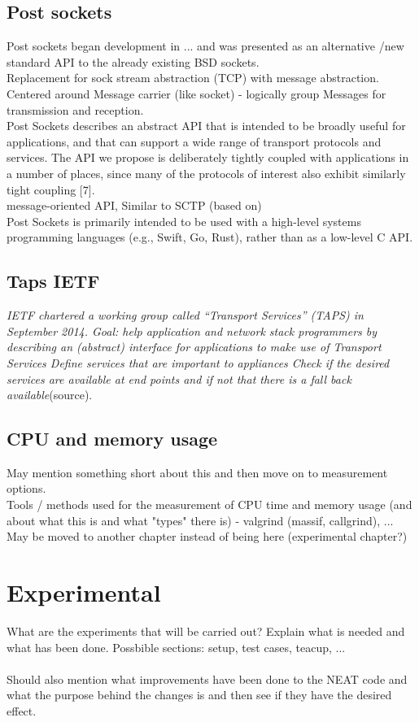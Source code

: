 \documentclass[12pt]{report}
\begin{document}
\section{Post sockets}
Post sockets began development in ... and was presented as an alternative /new standard  API to the already existing BSD sockets. \\
Replacement for sock stream abstraction (TCP) with message abstraction. \\
Centered around Message carrier (like socket) - logically group Messages for transmission and reception.\\
Post Sockets describes an abstract API that is intended to be broadly useful for applications, and that can support a wide range of transport protocols and services. The API we propose
is deliberately tightly coupled with applications in a number of places, since many of the protocols of interest also exhibit similarly tight coupling [7].\\
message-oriented API,
Similar to SCTP (based on) \\
Post Sockets is primarily intended to be used with a high-level systems programming languages (e.g., Swift, Go, Rust), rather than as a low-level C API.

\section{Taps IETF}
\textit{IETF chartered a working group called “Transport Services” (TAPS) in September 2014.
Goal:  help application and network stack programmers by describing an (abstract) interface for applications to make use of Transport Services
Define services that are important to appliances
Check if the desired services are available at end points and if not that there is a fall back available}(source).


\section{CPU and memory usage}
May mention something short about this and then move on to measurement options. \\
Tools / methods used for the measurement of CPU time and memory usage (and about what this is and what "types" there is) - valgrind (massif, callgrind), ... \\
May be moved to another chapter instead of being here (experimental chapter?)

\chapter{Experimental}
What are the experiments that will be carried out? Explain what is needed and what has been done. Possbible sections: setup, test cases, teacup, ... \\
\\
Should also mention what improvements have been done to the NEAT code and what the purpose behind the changes is and then see if they have the desired effect.
\end{document}

